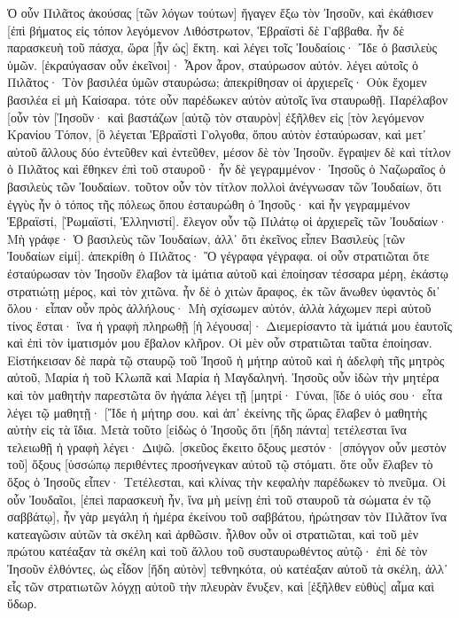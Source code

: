 Ὁ οὖν Πιλᾶτος ἀκούσας [τῶν λόγων τούτων] ἤγαγεν ἔξω τὸν Ἰησοῦν, καὶ ἐκάθισεν [ἐπὶ βήματος εἰς τόπον λεγόμενον Λιθόστρωτον, Ἑβραϊστὶ δὲ Γαββαθα. 
ἦν δὲ παρασκευὴ τοῦ πάσχα, ὥρα [ἦν ὡς] ἕκτη. καὶ λέγει τοῖς Ἰουδαίοις· Ἴδε ὁ βασιλεὺς ὑμῶν. 
[ἐκραύγασαν οὖν ἐκεῖνοι]· Ἆρον ἆρον, σταύρωσον αὐτόν. λέγει αὐτοῖς ὁ Πιλᾶτος· Τὸν βασιλέα ὑμῶν σταυρώσω; ἀπεκρίθησαν οἱ ἀρχιερεῖς· Οὐκ ἔχομεν βασιλέα εἰ μὴ Καίσαρα. 
τότε οὖν παρέδωκεν αὐτὸν αὐτοῖς ἵνα σταυρωθῇ. Παρέλαβον [οὖν τὸν [Ἰησοῦν· 
καὶ βαστάζων [αὑτῷ τὸν σταυρὸν] ἐξῆλθεν εἰς [τὸν λεγόμενον Κρανίου Τόπον, [ὃ λέγεται Ἑβραϊστὶ Γολγοθα, 
ὅπου αὐτὸν ἐσταύρωσαν, καὶ μετ᾽ αὐτοῦ ἄλλους δύο ἐντεῦθεν καὶ ἐντεῦθεν, μέσον δὲ τὸν Ἰησοῦν. 
ἔγραψεν δὲ καὶ τίτλον ὁ Πιλᾶτος καὶ ἔθηκεν ἐπὶ τοῦ σταυροῦ· ἦν δὲ γεγραμμένον· Ἰησοῦς ὁ Ναζωραῖος ὁ βασιλεὺς τῶν Ἰουδαίων. 
τοῦτον οὖν τὸν τίτλον πολλοὶ ἀνέγνωσαν τῶν Ἰουδαίων, ὅτι ἐγγὺς ἦν ὁ τόπος τῆς πόλεως ὅπου ἐσταυρώθη ὁ Ἰησοῦς· καὶ ἦν γεγραμμένον Ἑβραϊστί, [Ῥωμαϊστί, Ἑλληνιστί]. 
ἔλεγον οὖν τῷ Πιλάτῳ οἱ ἀρχιερεῖς τῶν Ἰουδαίων· Μὴ γράφε· Ὁ βασιλεὺς τῶν Ἰουδαίων, ἀλλ᾽ ὅτι ἐκεῖνος εἶπεν Βασιλεὺς [τῶν Ἰουδαίων εἰμί]. 
ἀπεκρίθη ὁ Πιλᾶτος· Ὃ γέγραφα γέγραφα. 
οἱ οὖν στρατιῶται ὅτε ἐσταύρωσαν τὸν Ἰησοῦν ἔλαβον τὰ ἱμάτια αὐτοῦ καὶ ἐποίησαν τέσσαρα μέρη, ἑκάστῳ στρατιώτῃ μέρος, καὶ τὸν χιτῶνα. ἦν δὲ ὁ χιτὼν ἄραφος, ἐκ τῶν ἄνωθεν ὑφαντὸς δι᾽ ὅλου· 
εἶπαν οὖν πρὸς ἀλλήλους· Μὴ σχίσωμεν αὐτόν, ἀλλὰ λάχωμεν περὶ αὐτοῦ τίνος ἔσται· ἵνα ἡ γραφὴ πληρωθῇ [ἡ λέγουσα]· Διεμερίσαντο τὰ ἱμάτιά μου ἑαυτοῖς καὶ ἐπὶ τὸν ἱματισμόν μου ἔβαλον κλῆρον. Οἱ μὲν οὖν στρατιῶται ταῦτα ἐποίησαν. 
Εἱστήκεισαν δὲ παρὰ τῷ σταυρῷ τοῦ Ἰησοῦ ἡ μήτηρ αὐτοῦ καὶ ἡ ἀδελφὴ τῆς μητρὸς αὐτοῦ, Μαρία ἡ τοῦ Κλωπᾶ καὶ Μαρία ἡ Μαγδαληνή. 
Ἰησοῦς οὖν ἰδὼν τὴν μητέρα καὶ τὸν μαθητὴν παρεστῶτα ὃν ἠγάπα λέγει τῇ [μητρί· Γύναι, [ἴδε ὁ υἱός σου· 
εἶτα λέγει τῷ μαθητῇ· [Ἴδε ἡ μήτηρ σου. καὶ ἀπ᾽ ἐκείνης τῆς ὥρας ἔλαβεν ὁ μαθητὴς αὐτὴν εἰς τὰ ἴδια. 
Μετὰ τοῦτο [εἰδὼς ὁ Ἰησοῦς ὅτι [ἤδη πάντα] τετέλεσται ἵνα τελειωθῇ ἡ γραφὴ λέγει· Διψῶ. 
[σκεῦος ἔκειτο ὄξους μεστόν· [σπόγγον οὖν μεστὸν τοῦ] ὄξους [ὑσσώπῳ περιθέντες προσήνεγκαν αὐτοῦ τῷ στόματι. 
ὅτε οὖν ἔλαβεν τὸ ὄξος ὁ Ἰησοῦς εἶπεν· Τετέλεσται, καὶ κλίνας τὴν κεφαλὴν παρέδωκεν τὸ πνεῦμα. 
Οἱ οὖν Ἰουδαῖοι, [ἐπεὶ παρασκευὴ ἦν, ἵνα μὴ μείνῃ ἐπὶ τοῦ σταυροῦ τὰ σώματα ἐν τῷ σαββάτῳ], ἦν γὰρ μεγάλη ἡ ἡμέρα ἐκείνου τοῦ σαββάτου, ἠρώτησαν τὸν Πιλᾶτον ἵνα κατεαγῶσιν αὐτῶν τὰ σκέλη καὶ ἀρθῶσιν. 
ἦλθον οὖν οἱ στρατιῶται, καὶ τοῦ μὲν πρώτου κατέαξαν τὰ σκέλη καὶ τοῦ ἄλλου τοῦ συσταυρωθέντος αὐτῷ· 
ἐπὶ δὲ τὸν Ἰησοῦν ἐλθόντες, ὡς εἶδον [ἤδη αὐτὸν] τεθνηκότα, οὐ κατέαξαν αὐτοῦ τὰ σκέλη, 
ἀλλ᾽ εἷς τῶν στρατιωτῶν λόγχῃ αὐτοῦ τὴν πλευρὰν ἔνυξεν, καὶ [ἐξῆλθεν εὐθὺς] αἷμα καὶ ὕδωρ. 
